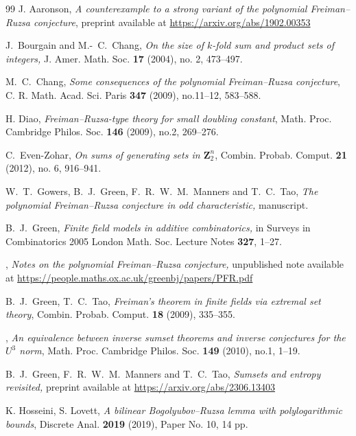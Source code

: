 \documentclass[12pt,reqno,tbtags]{amsart}
\theoremstyle{definition}
\theoremstyle{remark}
\def\Z{\mathbf{Z}}
\numberwithin{equation}{section}
\begin{document}
\begin{thebibliography}{99}
J. Aaronson, \emph{A counterexample to a strong variant of the polynomial Freiman--Ruzsa conjecture}, preprint available at \url{https://arxiv.org/abs/1902.00353}

 J.~Bourgain and M.-~C.~Chang, \emph{On the size of $k$-fold sum and product sets of integers,} J. Amer. Math. Soc. \textbf{17} (2004), no. 2, 473--497.


M.~C.~Chang, \emph{Some consequences of the polynomial Freiman--Ruzsa conjecture}, C. R. Math. Acad. Sci. Paris \textbf{347} (2009), no.11--12, 583--588.

H. Diao, \emph{Freiman--Ruzsa-type theory for small doubling constant}, Math. Proc. Cambridge Philos. Soc. \textbf{146} (2009), no.2, 269--276.


C.~Even-Zohar, \emph{On sums of generating sets in $\Z_2^n$}, Combin. Probab. Comput. \textbf{21} (2012), no. 6, 916--941.


   W.~T.~Gowers, B.~J.~Green, F.~R.~W.~M.~Manners and T.~C.~Tao, \emph{The polynomial Freiman--Ruzsa conjecture in odd characteristic,} manuscript.



   B.~J.~Green, \emph{Finite field models in additive combinatorics,} in Surveys in Combinatorics 2005  London Math. Soc. Lecture Notes \textbf{327}, 1--27.

   \bysame, \emph{Notes on the polynomial Freiman--Ruzsa conjecture,} unpublished note available at \url{https://people.maths.ox.ac.uk/greenbj/papers/PFR.pdf}

  B.~J.~Green, T.~C.~Tao, \emph{Freiman's theorem in finite fields via extremal set theory}, Combin. Probab. Comput. \textbf{18} (2009), 335--355.

\bysame, \emph{An equivalence between inverse sumset theorems and inverse conjectures for the $U^3$ norm}, Math. Proc. Cambridge Philos. Soc. \textbf{149} (2010), no.1, 1--19.

   B.~J.~Green, F.~R.~W.~M.~Manners and T.~C.~Tao, \emph{Sumsets and entropy revisited,} preprint available at \url{https://arxiv.org/abs/2306.13403}



  K. Hosseini, S. Lovett, \emph{A bilinear Bogolyubov--Ruzsa lemma with polylogarithmic bounds}, Discrete Anal. \textbf{2019} (2019), Paper No. 10, 14 pp.


\end{thebibliography}
\end{document}
